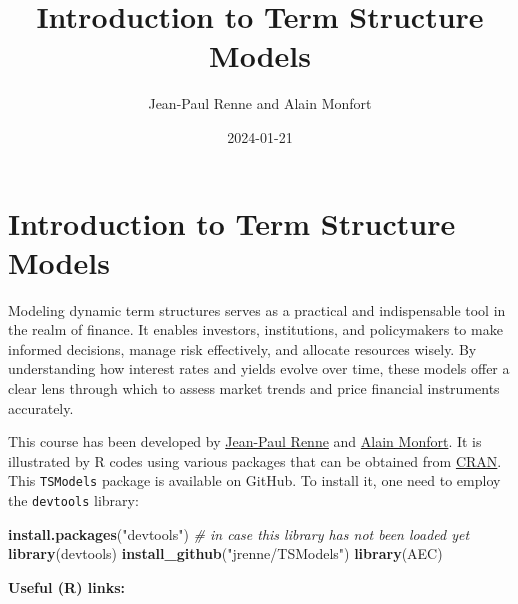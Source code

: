 \documentclass[
  12pt,
]{book}
\title{Introduction to Term Structure Models}
\author{Jean-Paul Renne and Alain Monfort}
\date{2024-01-21}
\newenvironment{Shaded}{\begin{snugshade}}{\end{snugshade}}
\newcommand{\CommentTok}[1]{\textcolor[rgb]{0.56,0.35,0.01}{\textit{#1}}}
\newcommand{\FunctionTok}[1]{\textcolor[rgb]{0.13,0.29,0.53}{\textbf{#1}}}
\newcommand{\NormalTok}[1]{#1}
\newcommand{\StringTok}[1]{\textcolor[rgb]{0.31,0.60,0.02}{#1}}
\theoremstyle{definition}
\theoremstyle{definition}
\theoremstyle{definition}
\theoremstyle{definition}
\theoremstyle{remark}
\begin{document}
\maketitle

{
\setcounter{tocdepth}{1}
\tableofcontents
}
\newcommand{\bv}[1]{\mathbf{#1}}

\hypertarget{intro}{%
\chapter*{Introduction to Term Structure Models}\label{intro}}

Modeling dynamic term structures serves as a practical and indispensable tool in the realm of finance. It enables investors, institutions, and policymakers to make informed decisions, manage risk effectively, and allocate resources wisely. By understanding how interest rates and yields evolve over time, these models offer a clear lens through which to assess market trends and price financial instruments accurately.

This course has been developed by \href{https://sites.google.com/site/jeanpaulrenne/home}{Jean-Paul Renne} and \href{https://faculty.crest.fr/amonfort/}{Alain Monfort}. It is illustrated by R codes using various packages that can be obtained from \href{https://cran.r-project.org}{CRAN}. This \texttt{TSModels} package is available on GitHub. To install it, one need to employ the \texttt{devtools} library:

\begin{Shaded}
\begin{Highlighting}[]
\FunctionTok{install.packages}\NormalTok{(}\StringTok{"devtools"}\NormalTok{) }\CommentTok{\# in case this library has not been loaded yet}
\FunctionTok{library}\NormalTok{(devtools)}
\FunctionTok{install\_github}\NormalTok{(}\StringTok{"jrenne/TSModels"}\NormalTok{)}
\FunctionTok{library}\NormalTok{(AEC)}
\end{Highlighting}
\end{Shaded}

\textbf{Useful (R) links:}
\end{document}
